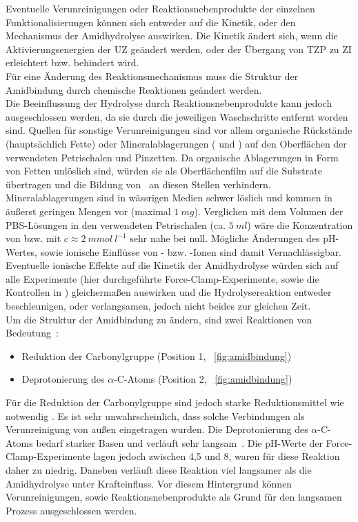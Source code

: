 Eventuelle Verunreinigungen oder Reaktionsnebenprodukte der einzelnen Funktionalisierungen können sich entweder auf die Kinetik, oder den Mechanismus der Amidhydrolyse auswirken. Die Kinetik ändert sich, wenn die Aktivierungsenergien der \ac{UZ} geändert werden, oder der Übergang von \ac{TZP} zu \ac{ZI} erleichtert bzw. behindert wird.\\
Für eine Änderung des Reaktionsmechanismus muss die Struktur der Amidbindung durch chemische Reaktionen geändert werden.\\

Die Beeinflussung der Hydrolyse durch Reaktionsnebenprodukte kann jedoch ausgeschlossen werden, da sie durch die jeweiligen Waschschritte entfernt worden sind. Quellen für sonstige Verunreinigungen sind vor allem organische Rückstände (hauptsächlich Fette) oder Mineralablagerungen ( und ) auf den Oberflächen der verwendeten Petrischalen und Pinzetten. Da organische Ablagerungen in Form von Fetten unlöslich sind, würden sie als Oberflächenfilm auf die Substrate übertragen und die Bildung von \amide~an diesen Stellen verhindern. Mineralablagerungen sind in wässrigen Medien schwer löslich und kommen in äußerst geringen Mengen vor (maximal $1~mg$). Verglichen mit dem Volumen der \ac{PBS}-Lösungen in den verwendeten Petrischalen (ca. $5~ml$) wäre die Konzentration von  bzw.  mit $c \approx 2~mmol~l^{-1}$ sehr nahe bei null. Mögliche Änderungen des pH-Wertes, sowie ionische Einflüsse von - bzw. -Ionen sind damit Vernachlässigbar.\\
Eventuelle ionische Effekte auf die Kinetik der Amidhydrolyse würden sich auf alle Experimente (hier durchgeführte Force-Clamp-Experimente, sowie die Kontrollen in \cite{ClausenSchaumann.2018}) gleichermaßen auswirken und die Hydrolysereaktion entweder beschleunigen, oder verlangsamen, jedoch nicht beides zur gleichen Zeit.\\

Um die Struktur der Amidbindung zu ändern, sind zwei Reaktionen von Bedeutung~\cite[301\psqq]{Latscha.2016}: 

\begin{itemize}
	\item Reduktion der Carbonylgruppe (Position 1, \abb~\ref{fig:amidbindung})
	\item Deprotonierung des $\alpha$-C-Atoms (Position 2, \abb~\ref{fig:amidbindung})
\end{itemize} 

Für die Reduktion der Carbonylgruppe sind jedoch starke Reduktionsmittel wie  notwendig \cites[306]{Latscha.2016}[208]{Leisering.2017}. Es ist sehr unwahrscheinlich, dass solche Verbindungen als Verunreinigung von außen eingetragen wurden. Die Deprotonierung des $\alpha$-C-Atoms bedarf starker Basen und verläuft sehr langsam~\cites[308]{Latscha.2016}[122]{Hadener.2006}. Die pH-Werte der Force-Clamp-Experimente lagen jedoch zwischen 4,5 und 8, waren für diese Reaktion daher zu niedrig. Daneben verläuft diese Reaktion viel langsamer als die Amidhydrolyse unter Krafteinfluss. Vor diesem Hintergrund können Verunreinigungen, sowie Reaktionsnebenprodukte als Grund für den langsamen Prozess ausgeschlossen werden.\\

